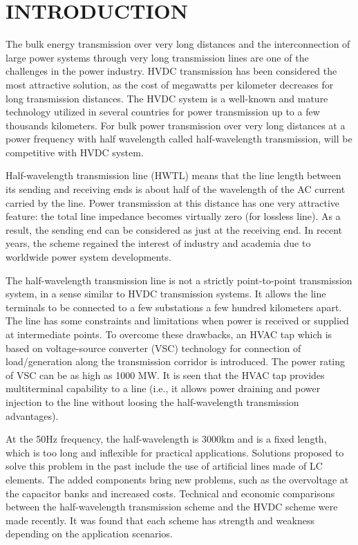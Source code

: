 \documentclass[12pt,a4paper]{reportmod}
\begin{document}
\chapter{INTRODUCTION}
\par The bulk energy transmission over very long distances and the interconnection of large power systems through very long transmission lines are one of the challenges in the power industry. HVDC transmission has been considered the most attractive solution, as the cost of megawatts per kilometer decreases for long transmission distances. The HVDC system is a well-known and mature technology utilized in several countries for power transmission up to a few thousands kilometers. For bulk power transmission over very long distances at a power frequency with half wavelength called half-wavelength transmission, will be competitive with HVDC system.
\par Half-wavelength transmission line (HWTL) means that the line length between its sending and receiving ends is about half of the wavelength of the AC current carried by the line. Power transmission at this distance has one very attractive feature: the total line impedance becomes virtually zero (for lossless line). As a result, the sending end can be considered as just at the receiving end. In recent years, the scheme regained the interest of industry and academia due to worldwide power system developments.
\par The half-wavelength transmission line is not a strictly point-to-point transmission system, in a sense similar to HVDC transmission systems. It allows the line terminals to be connected to a few substations a few hundred kilometers apart. The line has some constraints and limitations when power is received or supplied at intermediate points. To overcome these drawbacks, an HVAC tap which is based on voltage-source converter (VSC) technology for connection of load/generation along the transmission corridor is introduced. The power rating of VSC can be as high as 1000 MW. It is seen that the HVAC tap provides multiterminal capability to a line (i.e., it allows power draining and power injection to the line without loosing the half-wavelength transmission advantages).
\par At the 50Hz frequency, the half-wavelength is 3000km and is a fixed length, which is too long and inflexible for practical applications. Solutions proposed to solve this problem in the past include the use of artificial lines made of LC elements. The added components bring new problems, such as the overvoltage at the capacitor banks and increased costs. Technical and economic comparisons between the half-wavelength transmission scheme and the HVDC scheme were made recently. It was found that each scheme has strength and weakness depending on the application scenarios.
\end{document}
